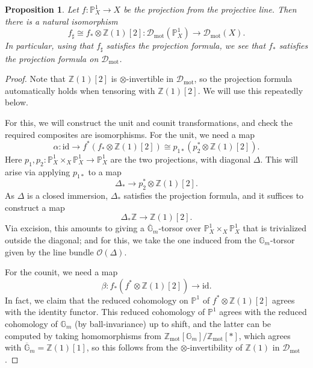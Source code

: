 \documentclass[11pt]{amsart}
\numberwithin{equation}{section}
\numberwithin{theorem}{section}
\newtheorem{proposition}[theorem]{Proposition}
\theoremstyle{definition}
\begin{document}
\begin{proposition}\label{prop:projectionformulaP1} Let $f: \mathbb P^1_X\to X$ be the projection from the projective line. Then there is a natural isomorphism
\[
f_\sharp\cong f_\ast\otimes \mathbb Z(1)[2]: \mathcal D_{\mathrm{mot}}(\mathbb P^1_X)\to \mathcal D_{\mathrm{mot}}(X).
\]
In particular, using that $f_\sharp$ satisfies the projection formula, we see that $f_\ast$ satisfies the projection formula on $\mathcal D_{\mathrm{mot}}$.
\end{proposition}

\begin{proof} Note that $\mathbb Z(1)[2]$ is $\otimes$-invertible in $\mathcal D_{\mathrm{mot}}$, so the projection formula automatically holds when tensoring with $\mathbb Z(1)[2]$. We will use this repeatedly below.

For this, we will construct the unit and counit transformations, and check the required composites are isomorphisms. For the unit, we need a map
\[
\alpha: \mathrm{id}\to f^\ast(f_\ast\otimes \mathbb Z(1)[2])\cong p_{1\ast}(p_2^\ast\otimes \mathbb Z(1)[2]).
\]
Here $p_1,p_2: \mathbb P^1_X\times_X\mathbb P^1_X\to \mathbb P^1_X$ are the two projections, with diagonal $\Delta$. This will arise via applying $p_{1\ast}$ to a map
\[
\Delta_\ast\to p_2^\ast\otimes \mathbb Z(1)[2].
\]
As $\Delta$ is a closed immersion, $\Delta_\ast$ satisfies the projection formula, and it suffices to construct a map
\[
\Delta_\ast \mathbb Z\to \mathbb Z(1)[2].
\]
Via excision, this amounts to giving a $\overline{\mathbb G}_m$-torsor over $\mathbb P^1_X\times_X \mathbb P^1_X$ that is trivialized outside the diagonal; and for this, we take the one induced from the $\mathbb G_m$-torsor given by the line bundle $\mathcal O(\Delta)$.

For the counit, we need a map
\[
\beta: f_\ast(f^\ast\otimes \mathbb Z(1)[2])\to \mathrm{id}.
\]
In fact, we claim that the reduced cohomology on $\mathbb P^1$ of $f^\ast\otimes \mathbb Z(1)[2]$ agrees with the identity functor. This reduced cohomology of $\mathbb P^1$ agrees with the reduced cohomology of $\mathbb G_m$ (by ball-invariance) up to shift, and the latter can be computed by taking homomorphisms from $\mathbb Z_{\mathrm{mot}}[\mathbb G_m]/\mathbb Z_{\mathrm{mot}}[\ast]$, which agrees with $\overline{\mathbb G}_m=\mathbb Z(1)[1]$, so this follows from the $\otimes$-invertibility of $\mathbb Z(1)$ in $\mathcal D_{\mathrm{mot}}$.


\end{proof}
\end{document}
